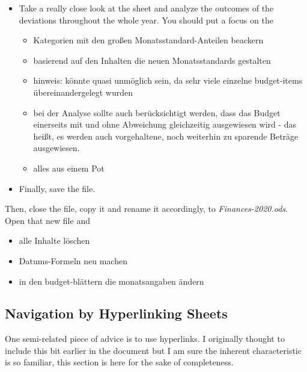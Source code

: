 \begin{itemize}
	\item Take a really close look at the  sheet and analyze the outcomes of the deviations throughout the whole year.
	You should put a focus on the 
	\begin{itemize}
		\item Kategorien mit den großen Monatsstandard-Anteilen beackern
		\item basierend auf den Inhalten die neuen Monatsstandards gestalten
		\item hinweis: könnte quasi unmöglich sein, da sehr viele einzelne budget-items übereinandergelegt wurden
		\item bei der Analyse sollte auch berücksichtigt werden, dass das Budget einerseits mit und ohne Abweichung gleichzeitig ausgewiesen wird - das heißt, es werden auch vorgehaltene, noch weiterhin zu sparende Beträge ausgewiesen.
		\item alles aus einem Pot
	\end{itemize}	
	\item Finally, save the file.	
\end{itemize}

Then, close the file, copy it and rename it accordingly, \eg to \emph{Finances-2020.ods}.
Open that new file and
\begin{itemize}
	\item alle Inhalte löschen
	\item Datums-Formeln neu machen
	\item in den budget-blättern die monatsangaben ändern
\end{itemize}

\subsection{Navigation by Hyperlinking Sheets}
\label{subsec:navigation-hyperlinking-sheets}

One semi-related piece of advice is to use hyperlinks.
I originally thought to include this bit earlier in the document but I am sure the inherent characteristic is so familiar, this section is here for the sake of completeness.

